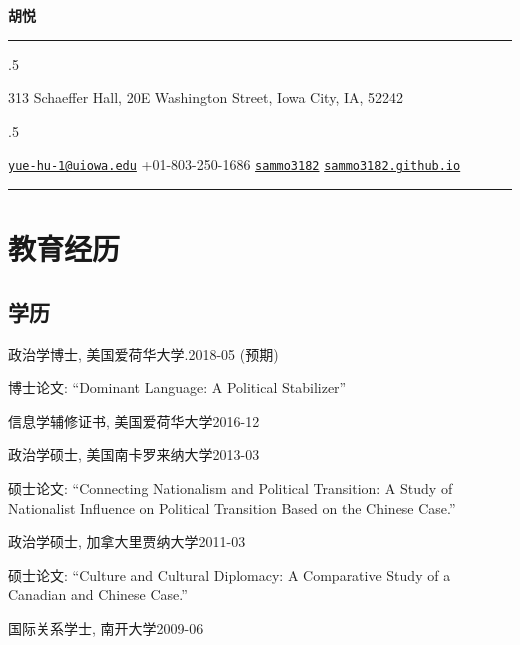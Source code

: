 \documentclass[10.5pt,]{article}
\providecommand{\tightlist}{%
  \setlength{\itemsep}{0pt}\setlength{\parskip}{0pt}}
\renewenvironment{itemize}{
  \begin{list}{}{
    \setlength{\leftmargin}{1.5em}
  }
}{
  \end{list}
}
\begin{document}
\centerline{\huge \bf 胡悦}

\vspace{2 mm}

\hrule

\vspace{2 mm}


\moveleft.5\hoffset\centerline{313 Schaeffer Hall, 20E Washington Street, Iowa City, IA, 52242}
\moveleft.5\hoffset\centerline{ \faEnvelopeO \hspace{1 mm} \href{mailto:}{\tt \href{mailto:yue-hu-1@uiowa.edu}{\nolinkurl{yue-hu-1@uiowa.edu}}} \hspace{1 mm}  \faPhone \hspace{1 mm}  +01-803-250-1686  \hspace{1 mm}  \faGithub \hspace{1 mm} \href{http://github.com/sammo3182}{\tt sammo3182} \hspace{1 mm}    \faGlobe \hspace{1 mm} \href{http://sammo3182.github.io}{\tt sammo3182.github.io}   }

\vspace{2 mm}

\hrule


\section{教育经历}

\subsection{学历}

\begin{itemize}
\tightlist
\item
  政治学博士, 美国爱荷华大学.\hfill 2018-05 (预期)

  \begin{itemize}
  \tightlist
  \item
    \footnotesize 博士论文: ``Dominant Language: A Political
    Stabilizer''
  \end{itemize}
\item
  信息学辅修证书, 美国爱荷华大学\hfill 2016-12
\item
  政治学硕士, 美国南卡罗来纳大学\hfill 2013-03

  \begin{itemize}
  \tightlist
  \item
    \footnotesize 硕士论文: ``Connecting Nationalism and Political
    Transition: A Study of Nationalist Influence on Political Transition
    Based on the Chinese Case.''
  \end{itemize}
\item
  政治学硕士, 加拿大里贾纳大学\hfill 2011-03

  \begin{itemize}
  \tightlist
  \item
    \footnotesize 硕士论文: ``Culture and Cultural Diplomacy: A
    Comparative Study of a Canadian and Chinese Case.''
  \end{itemize}
\item
  国际关系学士, 南开大学\hfill 2009-06
\end{itemize}
\end{document}
